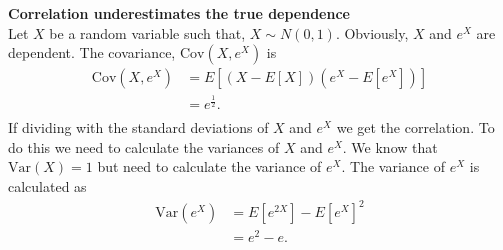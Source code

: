 \begin{example}\label{ex:CorrelationUnderestimates}
    \textbf{Correlation underestimates the true dependence} \\
    Let $X$ be a random variable such that, $X \sim N(0,1)$. Obviously, $X$ and $e^X$ are dependent. The covariance, $\mathrm{Cov}(X,e^X)$ is
    \begin{align*}
        \mathrm{Cov}(X,e^X) &= E \left[  (X-E\left[  X \right])(e^X-E\left[  e^X \right])  \right]\\
         &= e^{\frac{1}{2}}.\\
    \end{align*}
    If dividing with the standard deviations of $X$ and $e^X$ we get the correlation. To do this we need to calculate the variances of $X$ and $e^X$. We know that $\mathrm{Var}(X) = 1$ but need to calculate the variance of $e^X$. The variance of $e^X$ is calculated as
    \begin{align*}
        \mathrm{Var}(e^X) &= E[e^{2X}] - E[e^X]^2\\
        &= e^2 - e.
    \end{align*}

\end{example}
